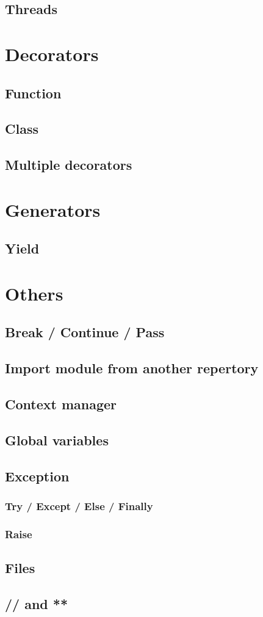 \documentclass{article}
\begin{document}
\subsection{Threads}

\newpage
\section{Decorators}
\subsection{Function}
\subsection{Class}
\subsection{Multiple decorators}

\newpage
\section{Generators}
\subsection{Yield}

\newpage
\section{Others}
\subsection{Break / Continue / Pass}
\subsection{Import module from another repertory}
\subsection{Context manager}
\subsection{Global variables}
\subsection{Exception}
\subsubsection{Try / Except / Else / Finally}
\subsubsection{Raise}
\subsection{Files}
\subsection{// and **}
\end{document}
